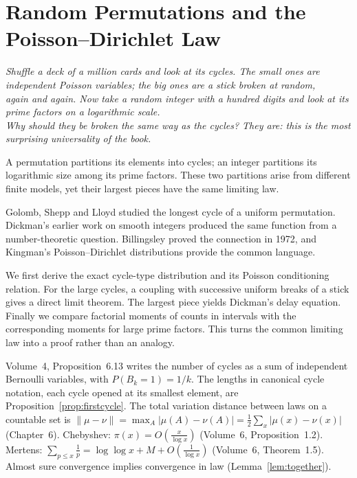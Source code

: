 \chapter{Random Permutations and the Poisson--Dirichlet Law}
\begin{center}\itshape
Shuffle a deck of a million cards and look at its cycles. The small ones are independent Poisson variables; the big ones are a stick broken at random,\\
again and again. Now take a random integer with a hundred digits and look at its prime factors on a logarithmic scale.\\
Why should they be broken the same way as the cycles? They are: this is the most surprising universality of the book.
\end{center}

A permutation partitions its elements into cycles; an integer partitions its logarithmic size among its prime factors. These two partitions arise from different finite models, yet their largest pieces have the same limiting law.

Golomb, Shepp and Lloyd studied the longest cycle of a uniform permutation. Dickman's earlier work on smooth integers produced the same function from a number-theoretic question. Billingsley proved the connection in 1972, and Kingman's Poisson--Dirichlet distributions provide the common language.

We first derive the exact cycle-type distribution and its Poisson conditioning relation. For the large cycles, a coupling with successive uniform breaks of a stick gives a direct limit theorem. The largest piece yields Dickman's delay equation. Finally we compare factorial moments of counts in intervals with the corresponding moments for large prime factors. This turns the common limiting law into a proof rather than an analogy.

\begin{reminder}
Volume~4, Proposition~6.13 writes the number of cycles as a sum of independent Bernoulli variables, with $P(B_k=1)=1/k$. The lengths in canonical cycle notation, each cycle opened at its smallest element, are Proposition~\ref{prop:firstcycle}. The total variation distance between laws on a countable set is
$\|\mu-\nu\|=\max_A|\mu(A)-\nu(A)|=\frac12\sum_x|\mu(x)-\nu(x)|$ (Chapter~6). Chebyshev: $\pi(x)=O(\frac x{\log x})$ (Volume~6, Proposition~1.2). Mertens: $\sum_{p\le x}\frac1p=\log\log x+M+O(\frac1{\log x})$ (Volume~6, Theorem~1.5).
Almost sure convergence implies convergence in law (Lemma~\ref{lem:together}).
\end{reminder}

